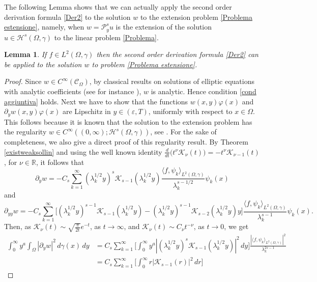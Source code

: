 \documentclass[a4paper,10pt,reqno]{amsart}
\newcommand{\R}{\mathbb{R}}
\newtheorem{lemma}[theorem]{Lemma}
\numberwithin{equation}{section}
\begin{document}
The following Lemma shows that we can actually apply the second order derivation formula
\eqref{Der2} to the solution $w$ to the extension problem \eqref{Problema estensione}, namely,
when $w=\mathcal{P}^s_yu$ is the extension of the solution
$u\in \mathcal{H}^s(\Omega,\gamma)$ to the linear problem \eqref{Problema}.

\begin{lemma}\label{lemma regolarita}
If $f\in L^{2}(\Omega,\gamma)$ then the second order derivation formula \eqref{Der2} can be applied to the solution $w$ to
problem \eqref{Problema estensione}.
\end{lemma}

\begin{proof}
Since $w\in C^\infty(\mathcal{C}_{\Omega})$,
by classical results on solutions of elliptic equations with analytic
coefficients (see for instance \cite{Hashimoto}),
$w$ is analytic. Hence condition \eqref{cond aggiuntiva} holds.
Next we have to show that the functions $w(x,y)\varphi
(x)$ and $\partial_{y}w(x,y)\varphi(x)$ are Lipschitz in $y\in(\varepsilon,T)$,
uniformly with respect to $x\in \Omega$. This follows because it is known that the solution
to the extension problem has the regularity $w\in  C^\infty((0,\infty);\mathcal{H}^s(\Omega,\gamma))$,
see \cite{Gale-Miana-Stinga, Stinga-Torrea}.
For the sake of completeness, we also give a direct proof of this regularity result.
By Theorem \ref{existweaksollin} and using the well known identity
$\frac{d}{dt}\big(t^\nu\mathcal{K}_\nu(t)\big)=-t^\nu\mathcal{K}_{\nu-1}(t)$, for $\nu\in\R$, it follows that
\[
\partial_{y}w=-C_s\sum_{k=1}^{\infty}(\lambda_k^{1/2}y)^s\mathcal{K}_{s-1}(\lambda_k^{1/2}y)
\frac{\langle f,\psi_{k}\rangle_{L^{2}(\Omega,\gamma)}}{\lambda_k^{s-1/2}}\psi_{k}(x)
\]
and
\[
\partial_{yy}w=-C_s\sum_{k=1}^{\infty}\big[(\lambda_k^{1/2}y)^{s-1}\mathcal{K}_{s-1}(\lambda_k^{1/2}y)
-(\lambda_k^{1/2}y)^{s-1}\mathcal{K}_{s-2}(\lambda_k^{1/2}y)y\big]
\frac{\langle f,\psi_{k}\rangle_{L^{2}(\Omega,\gamma)}}{\lambda_k^{s-1}}\psi_{k}(x).
\]
Then, as $\mathcal{K}_\nu(t)\sim\sqrt{\frac{\pi}{2t}}e^{-t}$, as $t\to\infty$, and
$\mathcal{K}_\nu(t)\sim C_\nu t^{-\nu}$, as $t\to0$, we get
\begin{align*}
\int_{0}^{\infty}y^a\int_{\Omega}|\partial_{y}w|^{2}\,d\gamma(x)\,dy
&=C_s\sum_{k=1}^\infty\bigg[\int_0^\infty y^a|(\lambda_k^{1/2}y)^s\mathcal{K}_{s-1}(\lambda_k^{1/2}y)|^2\,dy\bigg]
\frac{|\langle f,\psi_{k}\rangle_{L^{2}(\Omega,\gamma)}|^2}{\lambda_k^{2s-1}} \\
&=C_s\sum_{k=1}^\infty\bigg[\int_0^\infty r|\mathcal{K}_{s-1}(r)|^2\,dr\bigg]

\end{align*}
\end{proof}
\end{document}
